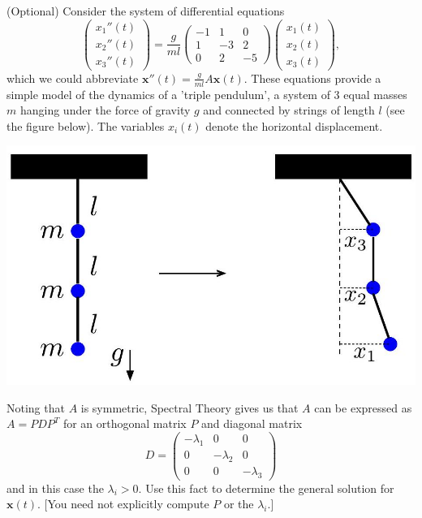 \documentclass[answers]{exam}
\begin{document}
\begin{questions}
\question%
(Optional) Consider the system of differential equations \[
	\begin{pmatrix}
		x_{1}''(t) \\
		x_{2}''(t) \\
		x_{3}''(t)
	\end{pmatrix}=\frac{g}{m l}\begin{pmatrix}
		-1 & 1 & 0 \\
		1 & -3 & 2 \\
		0 & 2 & -5
	\end{pmatrix}\begin{pmatrix}
		x_{1}(t) \\
		x_{2}(t) \\
		x_{3}(t)
	\end{pmatrix},
\] which we could abbreviate $\mathbf{x}''(t)=\frac{g}{m l} A \mathbf{x}(t)$. These equations provide a simple model of the dynamics of a 'triple pendulum', a system of 3 equal masses $m$ hanging under the force of gravity $g$ and connected by strings of length $l$ (see the figure below). The variables $x_{i}(t)$ denote the horizontal displacement.
\begin{center}\includegraphics[scale=0.25]{sheet 4 diagram}\end{center}
Noting that $A$ is symmetric, Spectral Theory gives us that $A$ can be expressed as $A=P D P^{T}$ for an orthogonal matrix $P$ and diagonal matrix \[
	D=\begin{pmatrix}
		-\lambda_{1} & 0 & 0 \\
		0 & -\lambda_{2} & 0 \\
		0 & 0 & -\lambda_{3}
	\end{pmatrix}
\] and in this case the $\lambda_{i}>0$. Use this fact to determine the general solution for $\mathbf{x}(t)$. [You need not explicitly compute $P$ or the $\lambda_{i}$.]

\end{questions}
\end{document}
